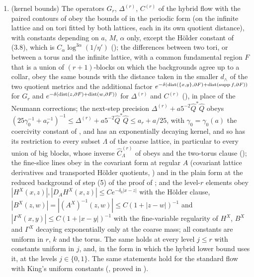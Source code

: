 \begin{proposition}
\begin{enumerate}[label=\textup{(\alph*)},leftmargin=*]
\item \textup{(kernel bounds)} The operators $G_r$, $\Delta^{(r)}$, $C^{(r)}$ of the hybrid flow with the paired contours of  obey the bounds of \cite[Thm.~3.3, (3.5)--(3.8)]{K1} in the periodic form (on the infinite lattice and on tori fitted by both lattices, each in its own quotient distance), with constants depending on $a$, $M$, $\alpha$ only, except the H\"older constant of (3.8), which is $C_\alpha\log^{3\alpha}(1/\eta')$ (); the differences between two tori, or between a torus and the infinite lattice, with a common fundamental region $F$ that is a union of $(r+1)$-blocks on which the backgrounds agree up to a collar, obey the same bounds with the distance taken in the smaller $d_\wedge$ of the two quotient metrics and the additional factor $e^{-\delta(\operatorname{dist}(\{x,y\},\partial F)+\operatorname{dist}(\operatorname{supp} f,\partial F))}$ for $G_r$ and $e^{-\delta(\operatorname{dist}(z,\partial F)+\operatorname{dist}(w,\partial F))}$ for $\Delta^{(r)}$ and $C^{(r)}$ (), in place of the Neumann corrections; the next-step precision $\Delta^{(r)}+a5^{-2}\hat Q^*\hat Q$ obeys $(25\gamma_0^{-1}+a_r^{-1})^{-1}\le\Delta^{(r)}+a5^{-2}\hat Q^*\hat Q\le a_r+a/25$, with $\gamma_0=\gamma_0(a)$ the coercivity constant of , and has an exponentially decaying kernel, and so has its restriction to every subset $\Lambda$ of the coarse lattice, in particular to every union of big blocks, whose inverse $\hat C^{(r)}_\Lambda$ of \cite[(5.53)]{K2} obeys \cite[(5.54)]{K2} and the two-torus clause (); the fine-slice lines obey \cite[(3.63)--(3.65)]{K1} in the covariant form at regular $A$ (covariant lattice derivatives and transported H\"older quotients, \cite[(2.10)--(2.11)]{Ba3}) and in the plain form at the reduced background of step (5) of the proof of ; and the level-$r$ elements obey $|H^X(x,z)|,|D_AH^X(x,z)|\le Ce^{-\delta_0|x-z|}$ with the H\"older clause, $|B^X(z,w)|=|(A^X)^{-1}(z,w)|\le C(1+|z-w|)^{-1}$ and $|\Gamma^X(x,y)|\le C(1+|x-y|)^{-1}$ with the fine-variable regularity of $H^X$, $B^X$ and $\Gamma^X$ decaying exponentially only at the coarse mass; all constants are uniform in $r$, $k$ and the torus. The same holds at every level $j\le r$ with constants uniform in $j$, and, in the form in which the hybrid lower bound uses it, at the levels $j\in\{0,1\}$. The same statements hold for the standard flow with King's uniform constants (\cite[Thm.~3.3]{K1}, proved in \cite{Ba4}).

\end{enumerate}
\end{proposition}
